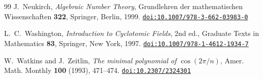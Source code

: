 \documentclass[11pt]{amsart}
\theoremstyle{definition}
\theoremstyle{remark}
\numberwithin{equation}{section}
\newcommand{\doi}[1]{\href{https://doi.org/#1}{\nolinkurl{doi:#1}}}
\begin{document}
\begin{thebibliography}{99}
J.~Neukirch, \emph{Algebraic Number Theory}, Grundlehren der mathematischen Wissenschaften \textbf{322}, Springer, Berlin, 1999. \doi{10.1007/978-3-662-03983-0}

L.~C.~Washington, \emph{Introduction to Cyclotomic Fields}, 2nd ed., Graduate Texts in Mathematics \textbf{83}, Springer, New York, 1997. \doi{10.1007/978-1-4612-1934-7}

W.~Watkins and J.~Zeitlin, \emph{The minimal polynomial of $\cos(2\pi/n)$}, Amer. Math. Monthly \textbf{100} (1993), 471--474. \doi{10.2307/2324301}

\end{thebibliography}
\end{document}
